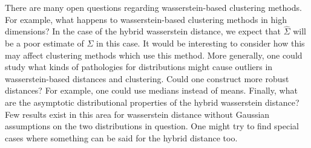 \documentclass[11pt, a4paper, fleqn]{article}
\numberwithin{equation}{section}
\numberwithin{figure}{section}
\numberwithin{table}{section}
\begin{document}
There are many open questions regarding wasserstein-based clustering methods. For example, what happens to wasserstein-based clustering methods in high dimensions? In the case of the hybrid wasserstein distance, we expect that $\hat{\Sigma}$ will be a poor estimate of $\Sigma$ in this case. It would be interesting to consider how this may affect clustering methods which use this method. More generally, one could study what kinds of pathologies for distributions might cause outliers in wasserstein-based distances and clustering. Could one construct more robust distances? For example, one could use medians instead of means. Finally, what are the asymptotic distributional properties of the hybrid wasserstein distance? Few results exist in this area for wasserstein distance without Gaussian assumptions on the two distributions in question. One might try to find special cases where something can be said for the hybrid distance too.




\end{document}
